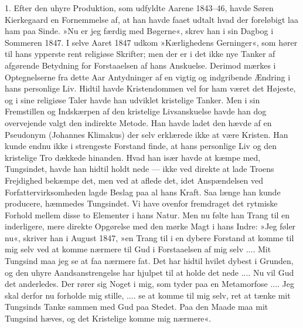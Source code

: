\documentclass[12pt,a4paper,openany]{book}
\newcommand{\opage}[1]{\marginnote{\footnotesize\textit{[#1]}}}
\begin{document}
1. Efter den uhyre Produktion, som udfyldte Aarene
1843--46, havde Søren Kierkegaard en Fornemmelse af,
at han havde faaet udtalt hvad der foreløbigt laa ham
paa Sinde. »Nu er jeg færdig med Bøgerne«, skrev han
i sin Dagbog i Sommeren 1847. I selve Aaret 1847 udkom
»Kærlighedens Gerninger«, som hører til hans ypperste
rent religiøse Skrifter; men der er i det ikke nye Tanker
af afgørende Betydning for Forstaaelsen af hans Anskuelse.
Derimod mærkes i Optegnelserne fra dette Aar
Antydninger af en vigtig og indgribende Ændring i hans
personlige Liv. Hidtil havde Kristendommen vel for ham
været det Højeste, og i sine religiøse Taler havde han
udviklet kristelige Tanker. Men i sin Fremstillen og
Indskærpen af den kristelige Livsanskuelse havde han
dog overvejende valgt den indirekte Metode. Han havde
ladet den hævde af en Pseudonym (Johannes Klimakus)
der selv erklærede ikke at være Kristen. Han kunde
endnu ikke i strengeste Forstand finde, at hans personlige
Liv og den kristelige Tro dækkede hinanden. Hvad
han især havde at kæmpe med, Tungsindet, havde han
\opage{128}hidtil holdt nede --- ikke ved direkte at lade Troens
Frejdighed bekæmpe det, men ved at aflede det, idet
Anspændelsen ved Forfattervirksomheden lagde Beslag
paa al hans Kraft. Saa længe han kunde producere,
hæmmedes Tungsindet. Vi have ovenfor fremdraget det
rytmiske Forhold mellem disse to Elementer i hans
Natur. Men nu følte han Trang til en inderligere, mere
direkte Opgørelse med den mørke Magt i hans Indre:
»Jeg føler nu«, skriver han i August 1847, »en Trang
til i en dybere Forstand at komme til mig selv ved at
komme nærmere til Gud i Forstaaelsen af mig selv ....
Mit Tungsind maa jeg se at faa nærmere fat. Det har
hidtil hvilet dybest i Grunden, og den uhyre Aandsanstrengelse
har hjulpet til at holde det nede .... Nu vil
Gud det anderledes. Der rører sig Noget i mig, som
tyder paa en Metamorfose .... Jeg skal derfor nu forholde
mig stille, .... se at komme til mig selv, ret at
tænke mit Tungsinds Tanke sammen med Gud paa Stedet.
Paa den Maade maa mit Tungsind hæves, og det Kristelige
komme mig nærmere«.
\end{document}
